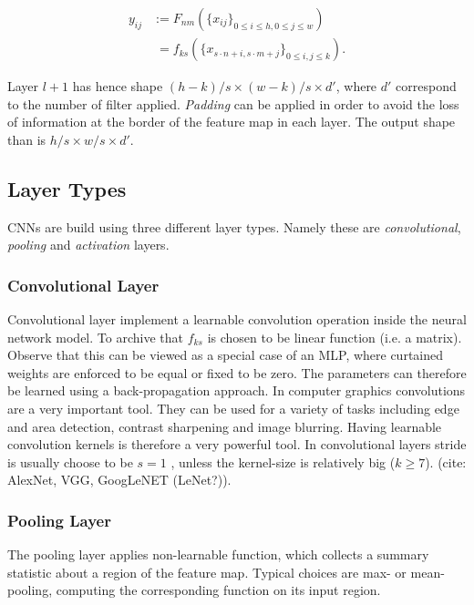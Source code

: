\begin{align*}
y_{ij} &:= F_{nm} (\{ x_{ij} \}_{0 \leq i \leq h, 0 \leq j \leq w}   ) \\&\; = f_{ks} (\{x_{s \cdot n + i, s \cdot m + j}  \}_{0 \leq i,j \leq k} ).
\end{align*}

Layer $l+1$ has hence shape $(h - k)/s \times (w-k)/s \times d'$, where $d'$ correspond to the number of filter applied. \emph{Padding} can be applied in order to avoid the loss of information at the border of the feature map in each layer. The output shape than is $h/s \times w/s \times d'$.

\subsection{Layer Types}

CNNs are build using three different layer types. Namely these are \emph{convolutional}, \emph{pooling} and \emph{activation} layers.

\subsubsection{Convolutional Layer}

Convolutional layer implement a learnable convolution operation inside the neural network model. To archive that $f_{ks}$ is chosen to be linear function (i.e. a matrix). Observe that this can be viewed as a special case of an MLP, where curtained weights are enforced to be equal or fixed to be zero. The parameters can therefore be learned using a back-propagation approach. In computer graphics convolutions are a very important tool. They can be used for a variety of tasks including edge and area detection, contrast sharpening and image blurring. Having learnable convolution kernels is therefore a very powerful tool. In convolutional layers stride is usually choose to be $s=1$ , unless the kernel-size is relatively big ($k \geq 7$).  (cite: AlexNet, VGG, GoogLeNET (LeNet?)).

 
 \subsubsection{Pooling Layer}

The pooling layer applies non-learnable function, which collects a summary statistic about a region of the feature map. Typical choices are max- or mean-pooling, computing the corresponding function on its input region. 

